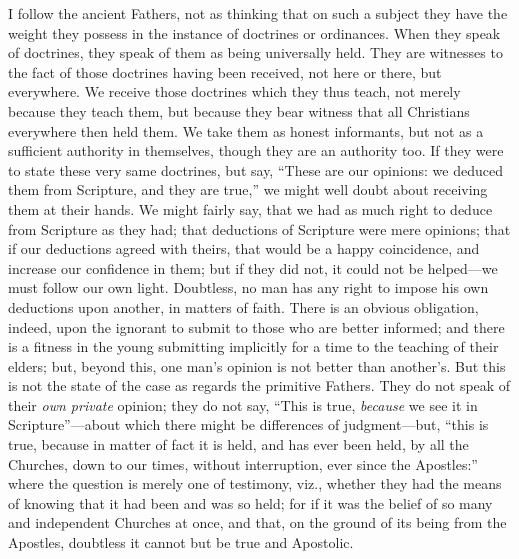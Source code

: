 I follow the ancient Fathers, not as thinking that on such a
subject they have the weight they possess in the instance of doctrines
or ordinances. When they speak of doctrines, they speak of them as
being universally held. They are witnesses to the fact of those
doctrines having been received, not here or there, but everywhere. We
receive those doctrines which they thus teach, not merely because they
teach them, but because they bear witness that all Christians
everywhere then held them. We take them as honest informants, but not
as a sufficient authority in themselves, though they are an authority
too. If they were to state these very same doctrines, but say,
``These are our opinions: we deduced them from Scripture, and they
are true,'' we might well doubt about receiving them at their
hands. We might fairly say, that we had as much right to deduce from
Scripture as they had; that deductions of Scripture were mere
opinions; that if our deductions agreed with theirs, that would be a
happy coincidence, and increase our confidence in them; but if they
did not, it could not be helped—we must follow our own light.
Doubtless, no man has any right to impose his own deductions upon
another, in matters of faith. There is an obvious obligation, indeed,
upon the ignorant to submit to those who are better informed; and
there is a fitness in the young submitting implicitly for a time to
the teaching of their elders; but, beyond this, one man's opinion is
not better than another's. But this is not the state of the case
as regards the primitive Fathers. They do not speak of their \emph{own
private} opinion; they do not say, ``This is true, \emph{because}
we see it in Scripture''—about which there might be differences
of judgment—but, ``this is true, because in matter of fact it is
held, and has ever been held, by all the Churches, down to our times,
without interruption, ever since the Apostles:'' where the
question is merely one of testimony, viz., whether they had the means
of knowing that it had been and was so held; for if it was the belief
of so many and independent Churches at once, and that, on the ground
of its being from the Apostles, doubtless it cannot but be true and
Apostolic.

